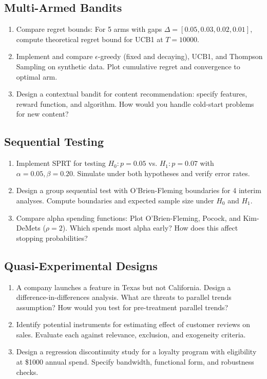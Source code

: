 \subsection{Multi-Armed Bandits}

\begin{enumerate}
    \item Compare regret bounds: For 5 arms with gaps $\Delta = [0.05, 0.03, 0.02, 0.01]$, compute theoretical regret bound for UCB1 at $T=10000$.

    \item Implement and compare $\epsilon$-greedy (fixed and decaying), UCB1, and Thompson Sampling on synthetic data. Plot cumulative regret and convergence to optimal arm.

    \item Design a contextual bandit for content recommendation: specify features, reward function, and algorithm. How would you handle cold-start problems for new content?
\end{enumerate}

\subsection{Sequential Testing}

\begin{enumerate}
    \item Implement SPRT for testing $H_0: p = 0.05$ vs. $H_1: p = 0.07$ with $\alpha = 0.05, \beta = 0.20$. Simulate under both hypotheses and verify error rates.

    \item Design a group sequential test with O'Brien-Fleming boundaries for 4 interim analyses. Compute boundaries and expected sample size under $H_0$ and $H_1$.

    \item Compare alpha spending functions: Plot O'Brien-Fleming, Pocock, and Kim-DeMets ($\rho = 2$). Which spends most alpha early? How does this affect stopping probabilities?
\end{enumerate}

\subsection{Quasi-Experimental Designs}

\begin{enumerate}
    \item A company launches a feature in Texas but not California. Design a difference-in-differences analysis. What are threats to parallel trends assumption? How would you test for pre-treatment parallel trends?

    \item Identify potential instruments for estimating effect of customer reviews on sales. Evaluate each against relevance, exclusion, and exogeneity criteria.

    \item Design a regression discontinuity study for a loyalty program with eligibility at \$1000 annual spend. Specify bandwidth, functional form, and robustness checks.
\end{enumerate}

